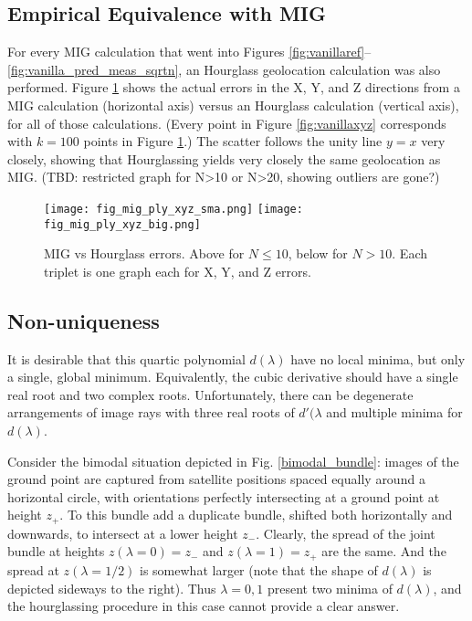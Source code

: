 \documentclass{amsart}
\begin{document}
\subsection{Empirical Equivalence with MIG}
For every MIG calculation that went into Figures
\ref{fig:vanillaref}--\ref{fig:vanilla_pred_meas_sqrtn}, an Hourglass geolocation
calculation was also performed. Figure \ref{fig:mig_vs_hourglass} shows the
actual errors in the X, Y, and Z directions from a MIG calculation (horizontal
axis) versus an Hourglass calculation (vertical axis), for all of those
calculations. (Every point in Figure \ref{fig:vanillaxyz} corresponds with
$k=100$ points in Figure \ref{fig:mig_vs_hourglass}.) The scatter follows the
unity line $y=x$ very closely, showing that Hourglassing yields very closely the
same geolocation as MIG. (TBD: restricted graph for N>10 or N>20, showing
outliers are gone?)

\begin{figure}
\texttt{[image: fig\_mig\_ply\_xyz\_sma.png]}
\texttt{[image: fig\_mig\_ply\_xyz\_big.png]}
\caption{\label{fig:mig_vs_hourglass}MIG vs Hourglass errors.  Above for $N\le
  10$, below for $N>10$. Each triplet is one graph each for X, Y, and Z errors.}
\end{figure}


\subsection{Non-uniqueness}
It is desirable that this quartic polynomial $d(\lambda)$ have no
local minima, but only a single, global minimum. Equivalently, the
cubic derivative should have a single real root and two complex
roots. Unfortunately, there can be degenerate arrangements of image
rays with three real roots of $d'(\lambda$ and multiple minima for
$d(\lambda)$.

Consider the bimodal situation depicted in Fig. \ref{bimodal_bundle}:
images of the ground point are captured from satellite positions
spaced equally around a horizontal circle, with orientations perfectly
intersecting at a ground point at height $z_+$. To this bundle add a
duplicate bundle, shifted both horizontally and downwards, to
intersect at a lower height $z_-$. Clearly, the spread of the joint
bundle at heights $z(\lambda=0)=z_-$ and $z(\lambda=1)=z_+$ are the
same. And the spread at $z(\lambda=1/2)$ is somewhat larger (note that
the shape of $d(\lambda)$ is depicted sideways to the right). Thus
$\lambda={0,1}$ present two minima of $d(\lambda)$, and the
hourglassing procedure in this case cannot provide a clear answer.
\end{document}
